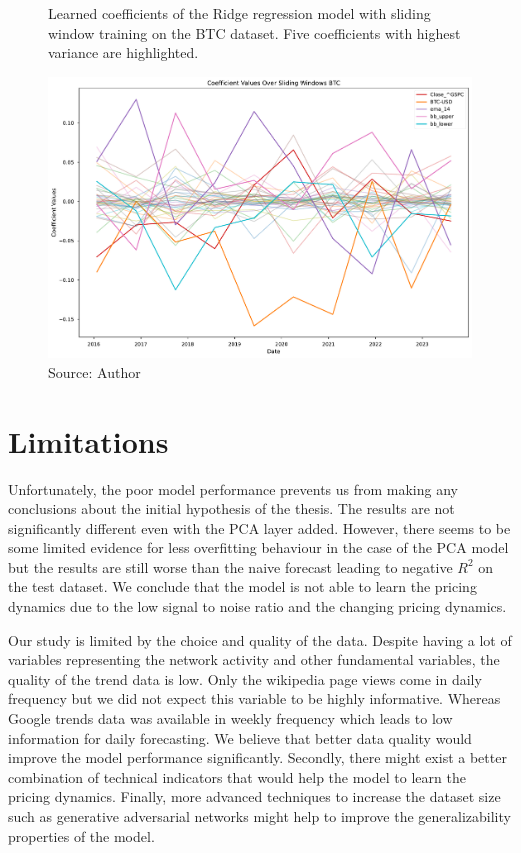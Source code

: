 \begin{figure}[!h]
    \centering
    \caption{Learned coefficients of the Ridge regression model
    with sliding window training on the BTC dataset. Five 
    coefficients with highest variance are highlighted.}
    \includegraphics[width=1\textwidth]{Figures/coefficient_values_sliding_btc.pdf}
    \caption*{Source: Author}
    \label{fig:coefs_sliding_btc}
\end{figure}

\section{Limitations}
\label{sec:limitations}
Unfortunately, the poor model performance 
prevents us from making any conclusions about the
initial hypothesis of the thesis. The results 
are not significantly different even with the \ac{PCA}
layer added. However, there seems
to be some limited evidence for less overfitting behaviour 
in the case of the \ac{PCA} model
but the results are still worse than the naive forecast leading to
negative $R^2$ on the test dataset. We conclude
that the model is not able to learn the pricing dynamics
due to the low signal to noise ratio and the changing pricing dynamics.


Our study is limited by the choice and 
quality of the data. Despite having 
a lot of variables representing the network activity and 
other fundamental variables, the quality of the trend data is low.
Only the wikipedia page views come in daily frequency
but we did not expect this variable to be highly informative. 
Whereas Google trends data was available in weekly frequency
which leads to low information for daily forecasting.
We believe that better data quality would improve
the model performance significantly. 
Secondly, there might exist a better combination of technical
indicators that would help the model to learn the pricing dynamics.
Finally, more advanced techniques to increase
the dataset size such as generative adversarial networks 
might help to improve the generalizability properties of the model.
